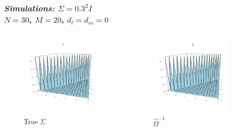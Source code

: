 \documentclass[12pt]{beamer}
\begin{document}
\begin{frame}
\frametitle{\emph{Simulations: }$\Sigma = 0.3^2 I$\\
$N = 30$, $M=20$, $d_l = d_m= 0$}


 \begin{columns}
\begin{column}{0.5\textwidth}
    \begin{center}
    \begin{figure}
    \graphicspath{{img/}}
 \includegraphics[width=4cm]{identity-cov-true-covariance}
 \caption{True $\Sigma$ }
 \end{figure}
     \end{center}
  \end{column}
\begin{column}{0.5\textwidth}  %
    \begin{center}
    \begin{figure}
    \graphicspath{{img/}}
 \includegraphics[width=4cm]{identity-cov-estimated-covariance}
 \caption{$\hat{\Omega}^{-1}$}
 \end{figure}
     \end{center}
\end{column}
\end{columns}


\end{frame}

\end{document}
